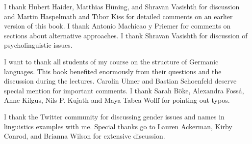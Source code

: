 \addchap{\lsAcknowledgementTitle} 

I thank Hubert Haider, Matthias Hüning, and Shravan Vasishth for discussion and Martin Haspelmath and Tibor Kiss for detailed comments
on an earlier version of this book. I thank Antonio Machicao y Priemer for comments on sections
about alternative approaches. I thank Shravan Vasishth for discussion of psycholinguistic issues.

I want to thank all students of my course on the structure of Germanic languages. This book
benefited enormously from their questions and the discussion during the lectures. 
Carolin Ulmer %
and
Bastian Schoenfeld %
deserve special mention for important comments. I thank 
Sarah Böke,
Alexandra Fosså,
Anne Kilgus,
Nils P. Kujath
and 
Maya Tabea Wolff  
for pointing out typos.


I thank the Twitter community for discussing gender issues and names in linguistics examples with
me. Special thanks go to Lauren Ackerman, Kirby Conrod, and Brianna Wilson for extensive discussion.




